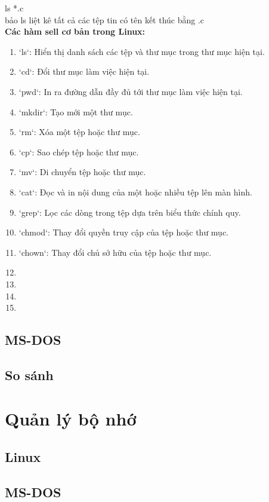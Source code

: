 \documentclass[12pt,a4paper]{article}
\begin{document}
ls *.c\\

bảo ls liệt kê tất cả các tệp tin có tên kết thúc bằng .c\\

\textbf{Các hàm sell cơ bản trong Linux:}\\

\begin{enumerate}
	\item `ls`: Hiển thị danh sách các tệp và thư mục trong thư mục hiện tại.
	\item `cd`: Đổi thư mục làm việc hiện tại.
	\item `pwd`: In ra đường dẫn đầy đủ tới thư mục làm việc hiện tại.
	\item `mkdir`: Tạo mới một thư mục.
	\item `rm`: Xóa một tệp hoặc thư mục.
	\item `cp`: Sao chép tệp hoặc thư mục.
	\item `mv`: Di chuyển tệp hoặc thư mục.
	\item `cat`: Đọc và in nội dung của một hoặc nhiều tệp lên màn hình.
	\item `grep`: Lọc các dòng trong tệp dựa trên biểu thức chính quy.
	\item `chmod`: Thay đổi quyền truy cập của tệp hoặc thư mục.
	\item `chown`: Thay đổi chủ sở hữu của tệp hoặc thư mục.
	\item 
	\item 
	\item 
	\item 
\end{enumerate}

\subsection{MS-DOS}
\subsection{So sánh}
\section{Quản lý bộ nhớ}
\subsection{Linux}
\subsection{MS-DOS}
\end{document}
